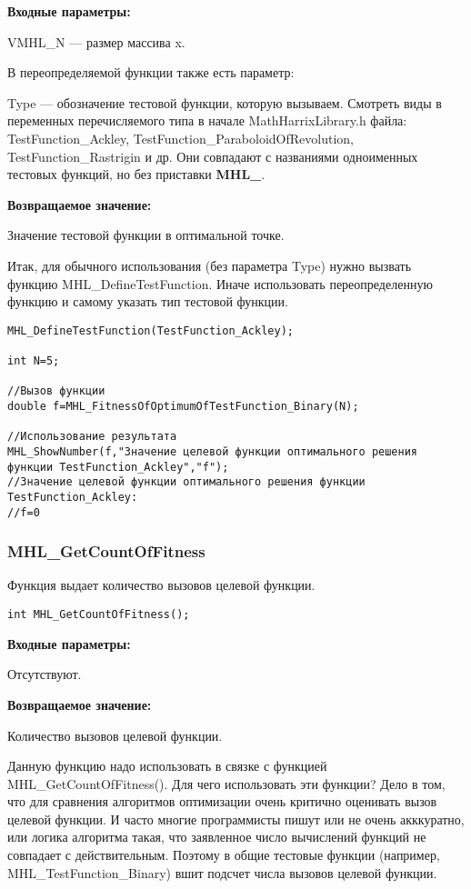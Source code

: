 \documentclass[a4paper,12pt]{article}
\begin{document}
\textbf{Входные параметры:}

VMHL\_N --- размер массива x.

В переопределяемой функции также есть параметр:
  
Type --- обозначение тестовой функции, которую вызываем.
Смотреть виды в переменных перечисляемого типа в начале MathHarrixLibrary.h файла: TestFunction\_Ackley, TestFunction\_ParaboloidOfRevolution, TestFunction\_Rastrigin и др. Они совпадают с названиями одноименных тестовых функций, но без приставки \textbf{MHL\_}.

\textbf{Возвращаемое значение:}
 
Значение тестовой функции в оптимальной точке.

Итак, для обычного использования (без параметра Type) нужно вызвать функцию MHL\_DefineTestFunction. Иначе использовать переопределенную функцию и самому указать тип тестовой функции.


\begin{lstlisting}[label=code_use_MHL_FitnessOfOptimumOfTestFunction_Real,caption=Пример использования]
MHL_DefineTestFunction(TestFunction_Ackley);

int N=5;

//Вызов функции
double f=MHL_FitnessOfOptimumOfTestFunction_Binary(N);

//Использование результата
MHL_ShowNumber(f,"Значение целевой функции оптимального решения функции TestFunction_Ackley","f");
//Значение целевой функции оптимального решения функции TestFunction_Ackley:
//f=0
\end{lstlisting}

\subsubsection{MHL\_GetCountOfFitness}\label{MHL_GetCountOfFitness}

Функция выдает количество вызовов целевой функции.


\begin{lstlisting}[label=code_syntax_MHL_GetCountOfFitness,caption=Синтаксис]
int MHL_GetCountOfFitness();
\end{lstlisting}

\textbf{Входные параметры:}

Отсутствуют.

\textbf{Возвращаемое значение:}
 
Количество вызовов целевой функции.

Данную функцию надо использовать в связке с функцией MHL\_GetCountOfFitness(). Для чего использовать эти функции? Дело в том, что для сравнения алгоритмов оптимизации очень критично оценивать вызов целевой функции. И часто многие программисты пишут или не очень акккуратно, или логика алгоритма такая, что заявленное число вычислений функций не совпадает с действительным. Поэтому в общие тестовые функции (например, MHL\_TestFunction\_Binary) вшит подсчет числа вызовов целевой функции.
\end{document}
